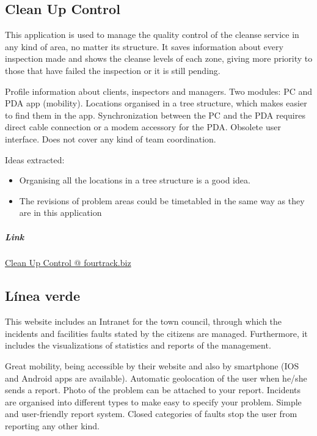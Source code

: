 \subsection{Clean Up Control}

This application is used to manage the quality control of the cleanse service in any kind of area, no matter its structure. It saves information about every inspection made and shows the cleanse levels of each zone, giving more priority to those that have failed the inspection or it is still pending.

\begin{itemize}
\adv Profile information about clients, inspectors and managers.
\adv Two modules: PC and PDA app (mobility).
\adv Locations organised in a tree structure, which makes easier to find them in the app.
\dsv Synchronization between the PC and the PDA requires direct cable connection or a modem accessory for the PDA.
\dsv Obsolete user interface.
\dsv Does not cover any kind of team coordination.
\end{itemize}

Ideas extracted:

\begin{itemize}
\item Organising all the locations in a tree structure is a good idea.
\item The revisions of problem areas could be timetabled in the same way as they are in this application
\end{itemize}

\subparagraph{Link}\href{http://www.fourtrack.biz/documents/castella/Clean-Up%20Control.pdf}{Clean Up Control @ fourtrack.biz}

\subsection{Línea verde}

This website includes an Intranet for the town council, through which the incidents and facilities faults stated by the citizens are managed. Furthermore, it includes the visualizations of statistics and reports of the management.

\begin{itemize}
\adv Great mobility, being accessible by their website and also by smartphone (IOS and Android apps are available).
\adv Automatic geolocation of the user when he/she sends a report.
\adv Photo of the problem can be attached to your report.
\adv Incidents are organised into different types to make easy to specify your problem.
\adv Simple and user-friendly report system.
\dsv Closed categories of faults stop the user from reporting any other kind.
\end{itemize}

